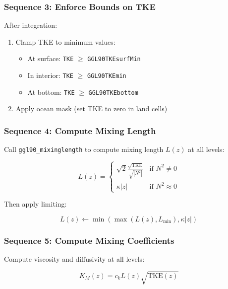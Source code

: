 \documentclass[11pt, a4paper]{article}
\begin{document}
\subsubsection{Sequence 3: Enforce Bounds on TKE}

After integration:

\begin{enumerate}
    \item Clamp TKE to minimum values:
    \begin{itemize}
        \item At surface: \texttt{TKE} $\geq$ \texttt{GGL90TKEsurfMin}
        \item In interior: \texttt{TKE} $\geq$ \texttt{GGL90TKEmin}
        \item At bottom: \texttt{TKE} $\geq$ \texttt{GGL90TKEbottom}
    \end{itemize}
    \item Apply ocean mask (set TKE to zero in land cells)
\end{enumerate}

\subsubsection{Sequence 4: Compute Mixing Length}

Call \texttt{ggl90\_mixinglength} to compute mixing length $L(z)$ at all levels:

\begin{equation}
L(z) = \begin{cases}
\sqrt{2}\frac{\sqrt{\text{TKE}}}{\sqrt{|N^2|}} & \text{if } N^2 \neq 0 \\
\kappa |z| & \text{if } N^2 \approx 0
\end{cases}
\end{equation}

Then apply limiting:

\begin{equation}
L(z) \leftarrow \min\left(\max(L(z), L_{\min}), \kappa |z|\right)
\end{equation}

\subsubsection{Sequence 5: Compute Mixing Coefficients}

Compute viscosity and diffusivity at all levels:

\begin{equation}
K_M(z) = c_k L(z) \sqrt{\text{TKE}(z)}
\end{equation}
\end{document}
